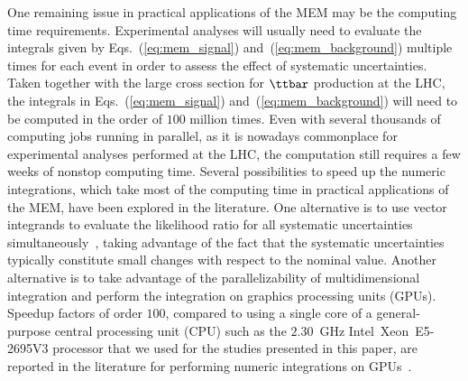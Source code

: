 One remaining issue in practical applications of the MEM may be the computing time requirements.
Experimental analyses will usually need to evaluate the integrals given by Eqs.~(\ref{eq:mem_signal}) and~(\ref{eq:mem_background})
multiple times for each event in order to assess the effect of systematic uncertainties.
Taken together with the large cross section for $\ttbar$ production at the LHC,
the integrals in Eqs.~(\ref{eq:mem_signal}) and~(\ref{eq:mem_background}) will need to be computed in the order of $100$ million times.
Even with several thousands of computing jobs running in parallel,
as it is nowadays commonplace for experimental analyses performed at the LHC,
the computation still requires a few weeks of nonstop computing time.
Several possibilities to speed up the numeric integrations, which take most of the computing time in practical applications of the MEM,
have been explored in the literature.
One alternative is to use vector integrands to evaluate the likelihood ratio for all systematic uncertainties simultaneously~\cite{CUBA},
taking advantage of the fact that the systematic uncertainties typically constitute small changes with respect to the nominal value.
Another alternative is to take advantage of the parallelizability of multidimensional integration and perform the integration on graphics processing units (GPUs).
Speedup factors of order $100$, compared to using a single core of a general-purpose central processing unit (CPU) 
such as the $2.30$~GHz Intel\TReg~Xeon\TReg~E5-2695V3 processor that we used for the studies presented in this paper,
are reported in the literature for performing numeric integrations on GPUs~\cite{Hagiwara:2009aq,Hagiwara:2009cy,Kanzaki:2010ym,Hagiwara:2013oka,Schouten:2014yza,Grasseau:2015vfa}.
